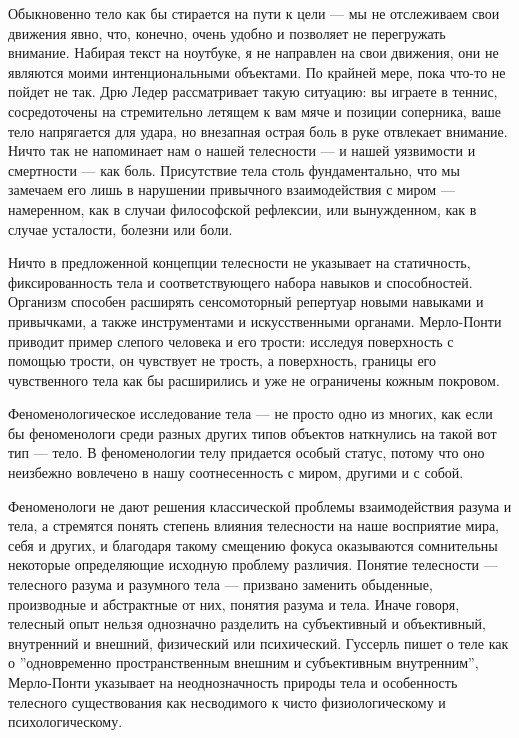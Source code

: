 \documentclass[11pt]{book}
\begin{document}
Обыкновенно тело как бы стирается на пути к цели --- мы не отслеживаем свои движения явно, что, конечно, очень удобно и позволяет не перегружать внимание. Набирая текст на ноутбуке, я не направлен на свои движения, они не являются моими интенциональными объектами. По крайней мере, пока что-то не пойдет не так. Дрю Ледер рассматривает такую ситуацию: вы играете в теннис, сосредоточены на стремительно летящем к вам мяче и позиции соперника, ваше тело напрягается для удара, но внезапная острая боль в руке отвлекает внимание. Ничто так не напоминает нам о нашей телесности --- и нашей уязвимости и смертности --- как боль. Присутствие тела столь фундаментально, что мы замечаем его лишь в нарушении привычного взаимодействия с миром --- намеренном, как в случаи философской рефлексии, или вынужденном, как в случае усталости, болезни или боли.

Ничто в предложенной концепции телесности не указывает на статичность, фиксированность тела и соответствующего набора навыков и способностей. Организм способен расширять сенсомоторный репертуар новыми навыками и привычками, а также инструментами и искусственными органами. Мерло-Понти приводит пример слепого человека и его трости: исследуя поверхность с помощью трости, он чувствует не трость, а поверхность, границы его чувственного тела как бы расширились и уже не ограничены кожным покровом.

Феноменологическое исследование тела --- не просто одно из многих, как если бы феноменологи среди разных других типов объектов наткнулись на такой вот тип --- тело. В феноменологии телу придается особый статус, потому что оно неизбежно вовлечено в нашу соотнесенность с миром, другими и с собой.

Феноменологи не дают решения классической проблемы взаимодействия разума и тела, а стремятся понять степень влияния телесности на наше восприятие мира, себя и других, и благодаря такому смещению фокуса оказываются сомнительны некоторые определяющие исходную проблему различия. Понятие телесности --- телесного разума и разумного тела --- призвано заменить обыденные, производные и абстрактные от них, понятия разума и тела. Иначе говоря, телесный опыт нельзя однозначно разделить на субъективный и объективный, внутренний и внешний, физический или психический. Гуссерль пишет о теле как о ''одновременно пространственным внешним и субъективным внутренним'', Мерло-Понти указывает на неоднозначность природы тела и особенность телесного существования как несводимого к чисто физиологическому и психологическому.
\end{document}
